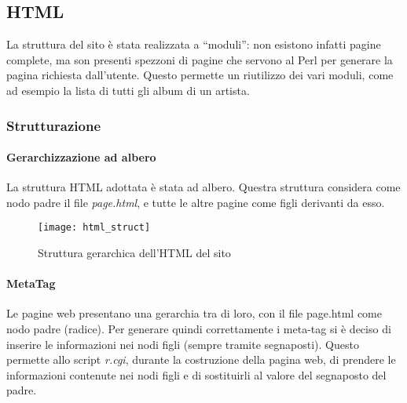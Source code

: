 \graphicspath{ {res/img/} }

\subsection{HTML}
La struttura del sito \`e stata realizzata a ``moduli'': non esistono infatti pagine complete, ma son presenti spezzoni di pagine che servono al Perl per generare la pagina richiesta dall'utente. Questo permette un riutilizzo dei vari moduli, come ad esempio la lista di tutti gli album di un artista.
\subsubsection{Strutturazione}

\paragraph*{Gerarchizzazione ad albero}La struttura HTML adottata \`e stata ad albero. Questra struttura considera come nodo padre il file \textit{page.html}, e tutte le altre pagine come figli derivanti da esso.


\begin{landscape}

  \thispagestyle{empty}

  \begin{figure}[H]
    \centering
    \texttt{[image: html\_struct]}
    \caption{Struttura gerarchica dell'HTML del sito}
  \end{figure}

\end{landscape}

\restoregeometry

\paragraph*{MetaTag}Le pagine web presentano una gerarchia tra di loro, con il file page.html come nodo padre (radice). Per generare quindi correttamente i meta-tag si \`e deciso di inserire le informazioni nei nodi figli (sempre tramite segnaposti). Questo permette allo script \textit{r.cgi}, durante la costruzione della pagina web, di prendere le informazioni contenute nei nodi figli e di sostituirli al valore del segnaposto del padre.

